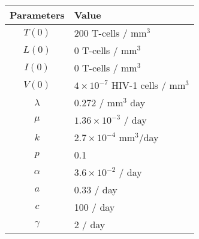 \begin{center}
    \begin{tabular}{|c|l|}
        \hline
        Parameters & Value \\ \hline \hline
        $T(0)$ & 200 T-cells / mm$^3$ \\ \hline
        $L(0)$ & 0 T-cells / mm$^3$ \\ \hline
        $I(0)$ & 0 T-cells / mm$^3$ \\ \hline
        $V(0)$ & $4 \times 10^{-7}$ HIV-1 cells / mm$^3$ \\ \hline
        $\lambda$ & 0.272 / mm$^3$ day \\\hline
        $\mu$ & $1.36 \times 10^{-3}$ / day \\\hline
        $k$ & $2.7 \times 10^{-4}$ mm$^3$/day \\\hline
        $p$ & 0.1 \\\hline
        $\alpha$ & $3.6 \times 10^{-2}$ / day \\\hline
        $a$ & 0.33 / day \\\hline
        $c$ & 100 / day \\\hline
        $\gamma$ & 2 / day \\\hline
    \end{tabular}
\end{center}
